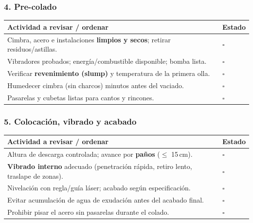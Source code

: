 \documentclass[12pt]{article}
\newcommand{\cbox}{\(\square\)} %
\begin{document}
 \subsubsection*{4. Pre-colado}
 \begin{tabularx}{\linewidth}{>{\raggedright\arraybackslash}p{0.93\linewidth} >{\centering\arraybackslash}m{0.07\linewidth}}
 	\toprule
 	\textbf{Actividad a revisar / ordenar} & \textbf{Estado}\\
 	\midrule
 	Cimbra, acero e instalaciones \textbf{limpios y secos}; retirar residuos/astillas. & \cbox \\
 	Vibradores probados; energía/combustible disponible; bomba lista. & \cbox \\
 	Verificar \textbf{revenimiento (slump)} y temperatura de la primera olla. & \cbox \\
 	Humedecer cimbra (sin charcos) minutos antes del vaciado. & \cbox \\
 	Pasarelas y cubetas listas para cantos y rincones. & \cbox \\
 	\bottomrule
 \end{tabularx}
 
 \subsubsection*{5. Colocación, vibrado y acabado}
 \begin{tabularx}{\linewidth}{>{\raggedright\arraybackslash}p{0.93\linewidth} >{\centering\arraybackslash}m{0.07\linewidth}}
 	\toprule
 	\textbf{Actividad a revisar / ordenar} & \textbf{Estado}\\
 	\midrule
 	Altura de descarga controlada; avance por \textbf{paños} (\(\leq\) 15\,cm). & \cbox \\
 	\textbf{Vibrado interno} adecuado (penetración rápida, retiro lento, traslape de zonas). & \cbox \\
 	Nivelación con regla/guía láser; acabado según especificación. & \cbox \\
 	Evitar acumulación de agua de exudación antes del acabado final. & \cbox \\
 	Prohibir pisar el acero sin pasarelas durante el colado. & \cbox \\
 	\bottomrule
 \end{tabularx}
 
\end{document}
